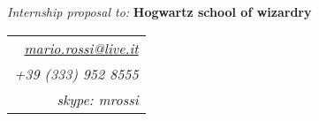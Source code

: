 \documentclass{scrartcl}
\begin{document}
\thispagestyle{empty} %

\begin{minipage}[t]{0.8\textwidth}

\begin{cv}{\LARGE{}}\vspace{1em} %
	\textit{Internship proposal to:} \textbf{Hogwartz school of wizardry}
\end{cv}
\end{minipage}
\hfill
\begin{minipage}[t]{0.2\textwidth}

\begin{tabular}{ r }
\small \textit{ \href{mailto:mario.rossi@live.it}{mario.rossi@live.it} }\\ 
\small \textit{+39 (333) 952 8555} \\ 
\small \textit{skype: mrossi}
   
\end{tabular}
\end{minipage}
\end{document}
